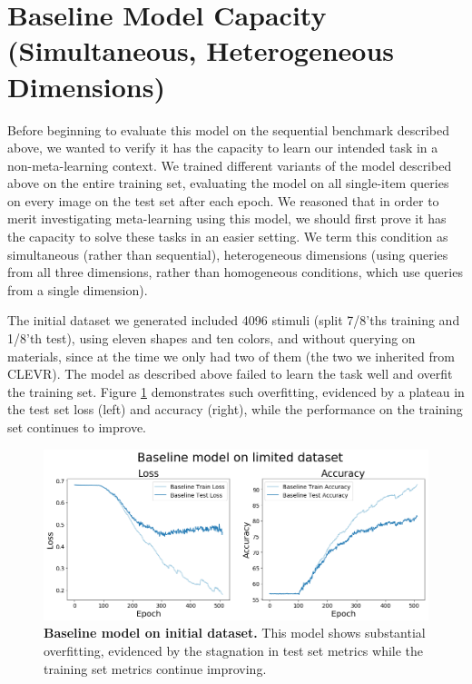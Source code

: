 \FloatBarrier
\section{Baseline Model Capacity (Simultaneous, Heterogeneous Dimensions)\label{res:baseline}}
Before beginning to evaluate this model on the sequential benchmark described above, we wanted to verify it has the capacity to learn our intended task in a non-meta-learning context. We trained different variants of the model described above on the entire training set, evaluating the model on all single-item queries on every image on the test set after each epoch. We reasoned that in order to merit investigating meta-learning using this model, we should first prove it has the capacity to solve these tasks in an easier setting. We term this condition as simultaneous (rather than sequential), heterogeneous dimensions (using queries from all three dimensions, rather than homogeneous conditions, which use queries from a single dimension).

The initial dataset we generated included 4096 stimuli (split 7/8'ths training and 1/8'th test), using eleven shapes and ten colors, and without querying on materials, since at the time we only had two of them (the two we inherited from CLEVR). The model as described above failed to learn the task well and overfit the training set. Figure \ref{fig:results-baseline-initial-dataset} demonstrates such overfitting, evidenced by a plateau in the test set loss (left) and accuracy (right), while the performance on the training set continues to improve.

\begin{figure}[!htb]
\centering
\includegraphics[width=\linewidth]{ch-results/figures/baseline/initial_dataset.png}
\caption{{\bf Baseline model on initial dataset.} This model shows substantial overfitting, evidenced by the stagnation in test set metrics while the training set metrics continue improving.}
\label{fig:results-baseline-initial-dataset}
\end{figure}

